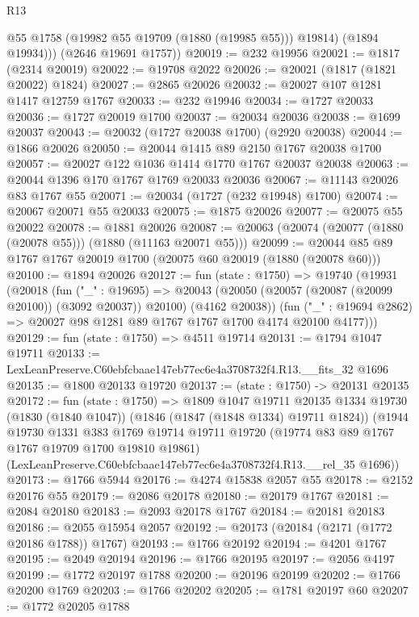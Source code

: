 \begin{lexlean}{R13}
\begin{coremodule}
            @55
            @1758
            (@19982 @55 @19709 (@1880 (@19985 @55)))
            @19814)
          (@1894 @19934)))
      (@2646 @19691 @1757))
@20019 := @232 @19956
@20021 := @1817 (@2314 @20019)
@20022 := @19708 @2022
@20026 := @20021 (@1817 (@1821 @20022) @1824)
@20027 := @2865 @20026
@20032 := @20027 @107 @1281 @1417 @12759 @1767
@20033 := @232 @19946
@20034 := @1727 @20033
@20036 := @1727 @20019 @1700
@20037 := @20034 @20036
@20038 := @1699 @20037
@20043 := @20032 (@1727 @20038 @1700) (@2920 @20038)
@20044 := @1866 @20026
@20050 := @20044 @1415 @89 @2150 @1767 @20038 @1700
@20057 := @20027 @122 @1036 @1414 @1770 @1767 @20037 @20038
@20063 := @20044 @1396 @170 @1767 @1769 @20033 @20036
@20067 := @11143 @20026 @83 @1767 @55
@20071 := @20034 (@1727 (@232 @19948) @1700)
@20074 := @20067 @20071 @55 @20033
@20075 := @1875 @20026
@20077 := @20075 @55 @20022
@20078 := @1881 @20026
@20087 := @20063 (@20074 (@20077 (@1880 (@20078 @55))) (@1880 (@11163 @20071 @55)))
@20099 := @20044 @85 @89 @1767 @1767 @20019 @1700 (@20075 @60 @20019 (@1880 (@20078 @60)))
@20100 := @1894 @20026
@20127 := fun (state : @1750) =>
  @19740
    (@19931
      (@20018
        (fun ("_" : @19695) =>
        @20043 (@20050 (@20057 (@20087 (@20099 @20100)) (@3092 @20037)) @20100) (@4162 @20038))
        (fun ("_" : @19694 @2862) => @20027 @98 @1281 @89 @1767 @1767 @1700 @4174 @20100 @4177)))
@20129 := fun (state : @1750) => @4511 @19714
@20131 := @1794 @1047 @19711
@20133 := LexLeanPreserve.C60ebfcbaae147eb77ec6e4a3708732f4.R13.__fits_32 @1696
@20135 := @1800 @20133 @19720
@20137 := (state : @1750) -> @20131 @20135
@20172 := fun (state : @1750) =>
  @1809
    @1047
    @19711
    @20135
    @1334
    @19730
    (@1830 (@1840 @1047))
    (@1846 (@1847 (@1848 @1334) @19711 @1824))
    (@1944
      @19730
      @1331
      @383
      @1769
      @19714
      @19711
      @19720
      (@19774 @83 @89 @1767 @1767 @19709 @1700 @19810 @19861)
      (LexLeanPreserve.C60ebfcbaae147eb77ec6e4a3708732f4.R13.__rel_35 @1696))
@20173 := @1766 @5944
@20176 := @4274 @15838 @2057 @55
@20178 := @2152 @20176 @55
@20179 := @2086 @20178
@20180 := @20179 @1767
@20181 := @2084 @20180
@20183 := @2093 @20178 @1767
@20184 := @20181 @20183
@20186 := @2055 @15954 @2057
@20192 := @20173 (@20184 (@2171 (@1772 @20186 @1788)) @1767)
@20193 := @1766 @20192
@20194 := @4201 @1767
@20195 := @2049 @20194
@20196 := @1766 @20195
@20197 := @2056 @4197
@20199 := @1772 @20197 @1788
@20200 := @20196 @20199
@20202 := @1766 @20200 @1769
@20203 := @1766 @20202
@20205 := @1781 @20197 @60
@20207 := @1772 @20205 @1788

\end{coremodule}
\end{lexlean}
